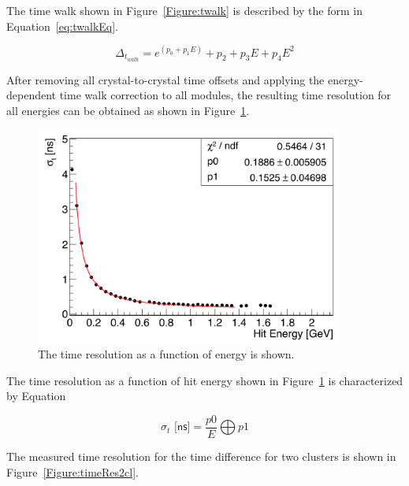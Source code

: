 The time walk shown in Figure~\ref{Figure:twalk} is described by the form in Equation~\eqref{eq:twalkEq}.

\begin{equation}
	\label{eq:twalkEq}
		\Delta_{t_{walk}} = e^(p_0+p_1E)+p_2+p_3E+p_4E^2	
\end{equation}

After removing all crystal-to-crystal time offsets and applying the energy-dependent time walk correction to all modules, the resulting time resolution for all energies can be obtained as shown in Figure~\ref{Figure:timeRes}. 

\begin{figure}[H]
  \centering
      \includegraphics[width=0.9\textwidth]{pics/performance/timeRes2016.png}
  \caption[Time resolution of the Ecal for the 2016 run ]{The time resolution as a function of energy is shown.}
  \label{Figure:timeRes}
\end{figure}

The time resolution as a function of hit energy shown in Figure~\ref{Figure:timeRes} is characterized by Equation 

\begin{equation}
	\label{eq:twalkEq}
		\sigma_t \textsf{ [ns]} = \dfrac{p0}{E}\bigoplus p1	
\end{equation}

The measured time resolution for the time difference for two clusters is shown in Figure~\ref{Figure:timeRes2cl}.

